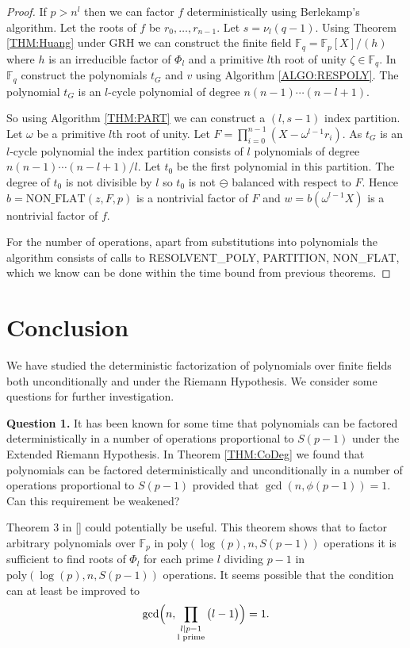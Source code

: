 \documentclass{article}
\let\chapter\section
\theoremstyle{plain}
\theoremstyle{definition}
\def\Fp {{ \mathbb{F} _ {p} }}
\def\Fq {{ \mathbb{F} _ {q} }}
\def\poly {{ \mathrm{poly} }}
\begin{document}
		\begin{proof}

        If $p>n^l$ then we can factor $f$ deterministically using Berlekamp's algorithm. Let the roots of $f$ be $r_0,\ldots,r_{n-1}$. Let $s=\nu_l(q-1)$. Using Theorem \ref{THM:Huang} under GRH we can construct the finite field $\Fq=\Fp[X]/(h)$ where $h$ is an irreducible factor of $\Phi_l$ and a primitive $l$th root of unity $\zeta \in \Fq$. In $\Fq$ construct the polynomials $t_G$ and $v$ using Algorithm \ref{ALGO:RESPOLY}. The polynomial $t_G$ is an $l$-cycle polynomial of degree $n(n-1)\cdots(n-l+1)$.
				
				So using Algorithm \ref{THM:PART} we can construct a $(l,s-1)$ index partition. Let $\omega$ be a primitive $l$th root of unity. Let $F=\prod_{i=0}^{n-1}{(X-\omega^{l-1} r_i)}$. As $t_G$ is an $l$-cycle polynomial the index partition consists of $l$ polynomials of degree $n(n-1)\cdots(n-l+1)/l$. Let $t_0$ be the first polynomial in this partition. The degree of $t_0$ is not divisible by $l$ so $t_0$ is not $\ominus$ balanced with respect to $F$. Hence $b=\textrm{NON\_FLAT}(z,F,p)$ is a nontrivial factor of $F$ and $w=b(\omega^{l-1}X)$ is a nontrivial factor of $f$.
				
				For the number of operations, apart from substitutions into polynomials the algorithm consists of calls to RESOLVENT\_POLY, PARTITION, NON\_FLAT, which we know can be done within the time bound from previous theorems.

		\end{proof}
		
%
%
\newpage
\chapter{Conclusion}
\label{CH:Conclusion}
%
%
    We have studied the deterministic factorization of polynomials over finite fields both unconditionally and under the Riemann Hypothesis. We consider some questions for further investigation.
		
    \textbf{Question 1.} It has been known for some time that polynomials can be factored deterministically in a number of operations proportional to $S(p-1)$ under the Extended Riemann Hypothesis. In Theorem \ref{THM:CoDeg} we found that polynomials can be factored deterministically and unconditionally in a number of operations proportional to $S(p-1)$ provided that $\gcd(n,\phi(p-1))=1$. Can this requirement be weakened?
		
		Theorem 3 in [] could potentially be useful. This theorem shows that to factor arbitrary polynomials over $\Fp$ in $\poly(\log(p),n,S(p-1))$ operations it is sufficient to find roots of $\Phi_l$ for each prime $l$ dividing $p-1$ in $\poly(\log(p),n,S(p-1))$ operations. It seems possible that the condition can at least be improved to 
		\[ \gcd \Bigl(n,\prod_{\substack{l \mid p-1 \\ \textrm{l prime} }}{\bigl(l-1 \bigr)} \Bigr)=1. \] 
		
\end{document}

